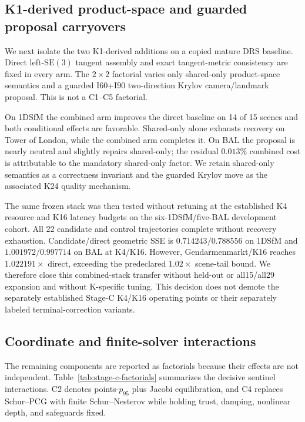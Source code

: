 \subsection{K1-derived product-space and guarded proposal carryovers}

We next isolate the two K1-derived additions on a copied mature DRS baseline.
Direct left-$\mathrm{SE}(3)$ tangent assembly and exact tangent-metric
consistency are fixed in every arm.  The $2\times2$ factorial varies only
shared-only product-space semantics and a guarded I60+I90 two-direction Krylov
camera/landmark proposal.  This is not a C1--C5 factorial.



On 1DSfM the combined arm improves the direct baseline on 14 of 15 scenes and
both conditional effects are favorable.  Shared-only alone exhausts recovery
on Tower of London, while the combined arm completes it.  On BAL the proposal
is nearly neutral and slightly repairs shared-only; the residual $0.013\%$
combined cost is attributable to the mandatory shared-only factor.  We retain
shared-only semantics as a correctness invariant and the guarded Krylov move as
the associated K24 quality mechanism.

The same frozen stack was then tested without retuning at the established K4
resource and K16 latency budgets on the six-1DSfM/five-BAL development cohort.
All 22 candidate and control trajectories complete without recovery
exhaustion.  Candidate/direct geometric SSE is $0.714243/0.788556$ on 1DSfM
and $1.001972/0.997714$ on BAL at K4/K16.  However, Gendarmenmarkt/K16 reaches
$1.022191\times$ direct, exceeding the predeclared $1.02\times$ scene-tail
bound.  We therefore close this combined-stack transfer without held-out or
all15/all29 expansion and without K-specific tuning.  This decision does not
demote the separately established Stage-C K4/K16 operating points or their
separately labeled terminal-correction variants.

\subsection{Coordinate and finite-solver interactions}

The remaining components are reported as factorials because their effects are
not independent.  Table~\ref{tab:stage-c-factorials} summarizes the decisive
sentinel interactions.  C2 denotes points-$p_{95}$ plus Jacobi equilibration,
and C4 replaces Schur--PCG with finite Schur--Nesterov while holding trust,
damping, nonlinear depth, and safeguards fixed.

